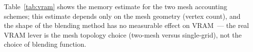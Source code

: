 Table~\ref{tab:vram} shows the memory estimate for the two mesh accounting schemes; this estimate depends only on the mesh geometry (vertex count), and the shape of the blending method has no measurable effect on VRAM~--- the real VRAM lever is the mesh topology choice (two-mesh versus single-grid), not the choice of blending function.
